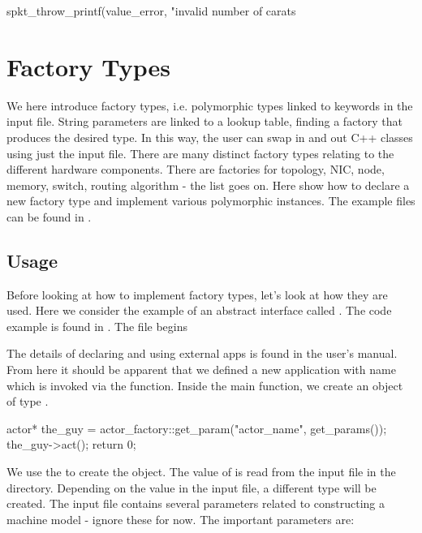 \begin{CppCode}
spkt_throw_printf(value_error, "invalid number of carats %
\end{CppCode}
 

\section{Factory Types}\label{sec:factory}
We here introduce factory types, i.e. polymorphic types linked to keywords in the input file.
String parameters are linked to a lookup table, finding a factory that produces the desired type.
In this way, the user can swap in and out C++ classes using just the input file.
There are many distinct factory types relating to the different hardware components.
There are factories for topology, NIC, node, memory, switch, routing algorithm - the list goes on.
Here show how to declare a new factory type and implement various polymorphic instances.
The example files can be found in .

\subsection{Usage}\label{subsec:usage}
Before looking at how to implement factory types, let's look at how they are used.
Here we consider the example of an abstract interface called .
The code example is found in . The file begins

\begin{CppCode}
#include <sstmac/skeleton.h>
#include "actor.h"

namespace sstmac {
    namespace tutorial {

#define sstmac_app_name rob_reiner

int main(int argc, char **argv)
{
\end{CppCode}
The details of declaring and using external apps is found in the user's manual.
From here it should be apparent that we defined a new application with name 
which is invoked via the  function.
Inside the main function, we create an object of type .

\begin{CppCode}
actor* the_guy = actor_factory::get_param("actor_name", get_params());
the_guy->act();
return 0;
\end{CppCode}
We use the  to create the object.
The value of  is read from the input file  in the directory.
Depending on the value in the input file, a different type will be created.
The input file contains several parameters related to constructing a machine model - ignore these for now.
The important parameters are:

